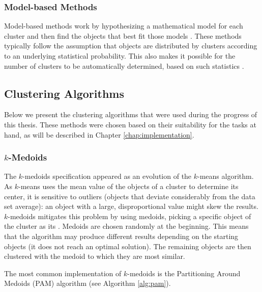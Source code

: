 \subsubsection*{Model-based Methods}

Model-based methods work by hypothesizing a mathematical model for each cluster
and then find the objects that best fit those models
\cite{DBLP:journals/corr/abs-1205-1117}. These methods typically follow the
assumption that objects are distributed by clusters according to an underlying
statistical probability. This also makes it possible for the number of clusters
to be automatically determined, based on such statistics \cite{han2006data}.

\subsection{Clustering Algorithms}\label{sec:clusteralgo}

Below we present the clustering algorithms that were used during the progress of
this thesis. These methods were chosen based on their suitability for the tasks
at hand, as will be described in Chapter \ref{chap:implementation}.

\subsubsection*{$k$-Medoids}

The $k$-medoids specification appeared as an evolution of the $k$-means
algorithm. As $k$-means uses the mean value of the objects of a cluster to
determine its center, it is sensitive to outliers (objects that deviate
considerably from the data set average): an object with a large, disproportional
value might skew the results. $k$-medoids mitigates this problem by using
medoids, picking a specific object of the cluster as its 
\cite{han2006data}. Medoids are chosen randomly at the beginning. This means
that the algorithm may produce different results depending on the starting
objects (it does not reach an optimal solution). The remaining objects are then
clustered with the medoid to which they are most similar.

The most common implementation of $k$-medoids is the Partitioning Around
Medoids (PAM) algorithm (see Algorithm \ref{alg:pam}).

